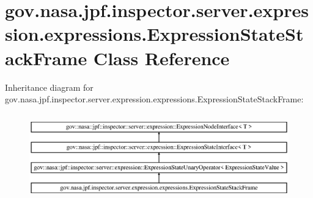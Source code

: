 \hypertarget{classgov_1_1nasa_1_1jpf_1_1inspector_1_1server_1_1expression_1_1expressions_1_1_expression_state_stack_frame}{}\section{gov.\+nasa.\+jpf.\+inspector.\+server.\+expression.\+expressions.\+Expression\+State\+Stack\+Frame Class Reference}
\label{classgov_1_1nasa_1_1jpf_1_1inspector_1_1server_1_1expression_1_1expressions_1_1_expression_state_stack_frame}
Inheritance diagram for gov.\+nasa.\+jpf.\+inspector.\+server.\+expression.\+expressions.\+Expression\+State\+Stack\+Frame\+:\begin{figure}[H]
\begin{center}
\leavevmode
\includegraphics[height=3.796610cm]{classgov_1_1nasa_1_1jpf_1_1inspector_1_1server_1_1expression_1_1expressions_1_1_expression_state_stack_frame}
\end{center}
\end{figure}
